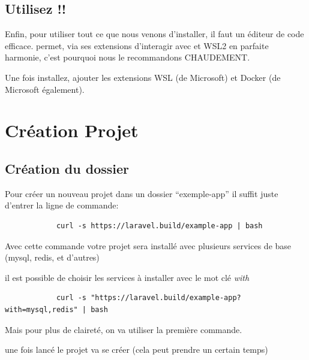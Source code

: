 \documentclass[internal]{nhitec_design}
\begin{document}
    \subsection[VS Code]{Utilisez \vscode!!}
    Enfin, pour utiliser tout ce que nous venons d'installer, il faut un éditeur de code efficace. \href{https://code.visualstudio.com/}{\vscode{}} permet, via ses extensions d'interagir avec \docker{} et WSL2 en parfaite harmonie, c'est pourquoi nous le recommandons CHAUDEMENT. 

    Une fois \vscode{} installez, ajouter les extensions WSL (de Microsoft) et Docker (de Microsoft également).





\newpage
\section[Création Projet Laravel]{Création Projet \laravel{}}

    \subsection{Création du dossier}
        Pour créer un nouveau projet \laravel{} dans un dossier ``exemple-app'' il suffit juste d'entrer la ligne de commande:

        \begin{lstlisting}
            curl -s https://laravel.build/example-app | bash
        \end{lstlisting}

        Avec cette commande votre projet sera installé avec plusieurs services de base (mysql, redis, et d'autres)

        il est possible de choisir les services à installer avec le mot clé \textit{with}

        \begin{lstlisting}
            curl -s "https://laravel.build/example-app?with=mysql,redis" | bash
        \end{lstlisting}
        Mais pour plus de claireté, on va utiliser la première commande.

        une fois lancé le projet va se créer (cela peut prendre un certain temps)
\end{document}
